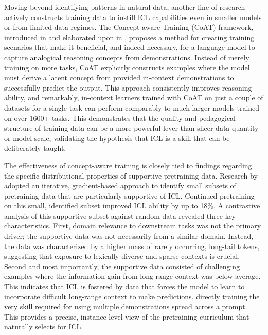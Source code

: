 \documentclass[11pt]{article}
\begin{document}
Moving beyond identifying patterns in natural data, another line of research actively constructs training data to instill ICL capabilities even in smaller models or from limited data regimes. The Concept-aware Training (CoAT) framework, introduced in \cite{ref68} and elaborated upon in \cite{ref190}, proposes a method for creating training scenarios that make it beneficial, and indeed necessary, for a language model to capture analogical reasoning concepts from demonstrations. Instead of merely training on more tasks, CoAT explicitly constructs examples where the model must derive a latent concept from provided in-context demonstrations to successfully predict the output. This approach consistently improves reasoning ability, and remarkably, in-context learners trained with CoAT on just a couple of datasets for a single task can perform comparably to much larger models trained on over 1600+ tasks. This demonstrates that the quality and pedagogical structure of training data can be a more powerful lever than sheer data quantity or model scale, validating the hypothesis that ICL is a skill that can be deliberately taught.

The effectiveness of concept-aware training is closely tied to findings regarding the specific distributional properties of supportive pretraining data. Research by \cite{ref41} adopted an iterative, gradient-based approach to identify small subsets of pretraining data that are particularly supportive of ICL. Continued pretraining on this small, identified subset improved ICL ability by up to 18\%. A contrastive analysis of this supportive subset against random data revealed three key characteristics. First, domain relevance to downstream tasks was not the primary driver; the supportive data was not necessarily from a similar domain. Instead, the data was characterized by a higher mass of rarely occurring, long-tail tokens, suggesting that exposure to lexically diverse and sparse contexts is crucial. Second and most importantly, the supportive data consisted of challenging examples where the information gain from long-range context was below average. This indicates that ICL is fostered by data that forces the model to learn to incorporate difficult long-range context to make predictions, directly training the very skill required for using multiple demonstrations spread across a prompt. This provides a precise, instance-level view of the pretraining curriculum that naturally selects for ICL.
\end{document}
